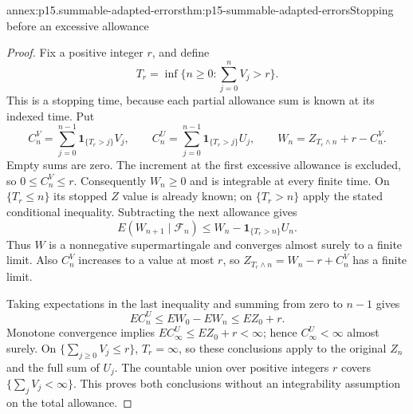 \begin{annexitem}{annex:p15.summable-adapted-errors}{thm:p15-summable-adapted-errors}{Stopping before an excessive allowance}
\begin{proof}
Fix a positive integer \(r\), and define
\[
                     T_r=\inf\{n\geq0:\sum_{j=0}^nV_j>r\}.
\]
This is a stopping time, because each partial allowance sum is
known at its indexed time. Put
\[
 C_n^V=\sum_{j=0}^{n-1}\mathbf1_{\{T_r>j\}}V_j,\qquad
 C_n^U=\sum_{j=0}^{n-1}\mathbf1_{\{T_r>j\}}U_j,\qquad
 W_n=Z_{T_r\wedge n}+r-C_n^V .
\]
Empty sums are zero. The increment at the first excessive
allowance is excluded, so \(0\leq C_n^V\leq r\).
Consequently \(W_n\geq0\) and is integrable at every finite time.
On \(\{T_r\leq n\}\) its stopped \(Z\) value is already known;
on \(\{T_r>n\}\) apply the stated conditional inequality.
Subtracting the next allowance gives
\[
                  E(W_{n+1}\mid\mathcal F_n)
                          \leq W_n-\mathbf1_{\{T_r>n\}}U_n.
\]
Thus \(W\) is a nonnegative supermartingale and converges
almost surely to a finite limit.
Also \(C_n^V\) increases to a value at most \(r\), so
\(Z_{T_r\wedge n}=W_n-r+C_n^V\) has a finite limit.

Taking expectations in the last inequality and summing from
zero to \(n-1\) gives
\[
                            EC_n^U\leq EW_0-EW_n\leq EZ_0+r .
\]
Monotone convergence implies \(EC_\infty^U\leq EZ_0+r<\infty\);
hence \(C_\infty^U<\infty\) almost surely.
On \(\{\sum_{j\geq0}V_j\leq r\}\), \(T_r=\infty\), so these
conclusions apply to the original \(Z_n\) and the full sum of \(U_j\).
The countable union over positive integers \(r\) covers
\(\{\sum_jV_j<\infty\}\). This proves both conclusions without
an integrability assumption on the total allowance.
\end{proof}
\end{annexitem}

